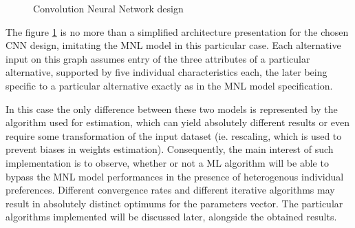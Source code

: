 \documentclass[11pt,]{article}
\begin{document}
\begin{figure}[!htbp] \centering 
 \caption{Convolution Neural Network design} 
 \label{fig:cnn} 
\end{figure}

The figure \ref{fig:cnn} is no more than a simplified architecture
presentation for the chosen CNN design, imitating the MNL model in this
particular case. Each alternative input on this graph assumes entry of
the three attributes of a particular alternative, supported by five
individual characteristics each, the later being specific to a
particular alternative exactly as in the MNL model specification.

In this case the only difference between these two models is represented
by the algorithm used for estimation, which can yield absolutely
different results or even require some transformation of the input
dataset (ie. rescaling, which is used to prevent biases in weights
estimation). Consequently, the main interest of such implementation is
to observe, whether or not a ML algorithm will be able to bypass the MNL
model performances in the presence of heterogenous individual
preferences. Different convergence rates and different iterative
algorithms may result in absolutely distinct optimums for the parameters
vector. The particular algorithms implemented will be discussed later,
alongside the obtained results.
\end{document}
